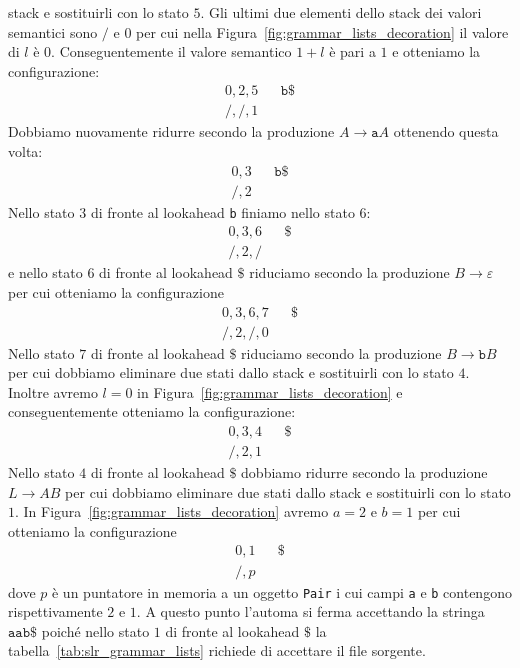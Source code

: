 stack e sostituirli con lo stato $5$. Gli ultimi due elementi dello stack
dei valori semantici sono $/$ e $0$ per cui nella
Figura~\ref{fig:grammar_lists_decoration} il valore di $l$ \`e $0$.
Conseguentemente il valore semantico $1+l$ \`e pari a $1$ e otteniamo la
configurazione:
%
\begin{align*}
  0,2,5 & & \mathtt{b\$}\\
  /,/,1 & &
\end{align*}
%
Dobbiamo nuovamente ridurre secondo la produzione $A\to\mathtt{a}A$ ottenendo
questa volta:
%
\begin{align*}
  0,3 & & \mathtt{b\$}\\
  /,2 & &
\end{align*}
%
Nello stato $3$ di fronte al lookahead \texttt{b} finiamo nello stato $6$:
%
\begin{align*}
  0,3,6 & & \mathtt{\$}\\
  /,2,/ & &
\end{align*}
%
e nello stato $6$ di fronte al lookahead $\mathtt{\$}$ riduciamo secondo la
produzione $B\to\varepsilon$ per cui otteniamo la configurazione
%
\begin{align*}
  0,3,6,7 & & \mathtt{\$}\\
  /,2,/,0 & &
\end{align*}
%
Nello stato $7$ di fronte al lookahead $\mathtt{\$}$ riduciamo secondo la
produzione $B\to\mathtt{b}B$ per cui dobbiamo eliminare due stati dallo stack
e sostituirli con lo stato $4$. Inoltre avremo $l=0$ in
Figura~\ref{fig:grammar_lists_decoration} e conseguentemente otteniamo la
configurazione:
%
\begin{align*}
  0,3,4 & & \mathtt{\$}\\
  /,2,1 & &
\end{align*}
%
Nello stato $4$ di fronte al lookahead $\mathtt{\$}$ dobbiamo ridurre
secondo la produzione $L\to AB$ per cui dobbiamo eliminare due
stati dallo stack e sostituirli con lo stato $1$. In
Figura~\ref{fig:grammar_lists_decoration} avremo $a=2$ e $b=1$ per cui
otteniamo la configurazione
%
\begin{align*}
  0,1 & & \mathtt{\$}\\
  /,p & &
\end{align*}
%
dove $p$ \`e un puntatore in memoria a un oggetto \texttt{Pair} i cui campi
\texttt{a} e \texttt{b} contengono rispettivamente $2$ e $1$.
A questo punto l'automa si ferma accettando la stringa $\mathtt{aab\$}$
poich\'e nello stato $1$ di fronte al lookahead $\mathtt{\$}$ la
tabella~\ref{tab:slr_grammar_lists} richiede di accettare il file sorgente.

